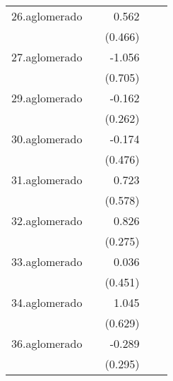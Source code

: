 {\begin{longtable}{l*{4}{D{.}{.}{-1}}}
\addlinespace
26.aglomerado&                     &       0.562         &                     &                     \\
            &                     &     (0.466)         &                     &                     \\
\addlinespace
27.aglomerado&                     &      -1.056         &                     &                     \\
            &                     &     (0.705)         &                     &                     \\
\addlinespace
29.aglomerado&                     &      -0.162         &                     &                     \\
            &                     &     (0.262)         &                     &                     \\
\addlinespace
30.aglomerado&                     &      -0.174         &                     &                     \\
            &                     &     (0.476)         &                     &                     \\
\addlinespace
31.aglomerado&                     &       0.723         &                     &                     \\
            &                     &     (0.578)         &                     &                     \\
\addlinespace
32.aglomerado&                     &       0.826\sym{**} &                     &                     \\
            &                     &     (0.275)         &                     &                     \\
\addlinespace
33.aglomerado&                     &       0.036         &                     &                     \\
            &                     &     (0.451)         &                     &                     \\
\addlinespace
34.aglomerado&                     &       1.045         &                     &                     \\
            &                     &     (0.629)         &                     &                     \\
\addlinespace
36.aglomerado&                     &      -0.289         &                     &                     \\
            &                     &     (0.295)         &                     &                     \\

\end{longtable}}
